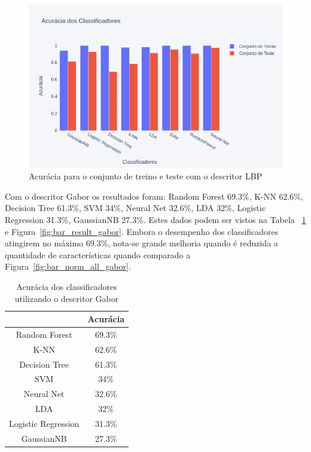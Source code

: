 \documentclass[a4paper, 12 pt, conference]{ieeeconf}  %
\begin{document}
\begin{figure}[!htbp]
	\centering
	\includegraphics[width=1.0\linewidth,clip=true,trim=0cm 0cm 0cm 0cm, keepaspectratio=true]{bar_result_lbp.png}
	\caption{Acurácia para o conjunto de treino e teste com o descritor LBP}
	\label{fig:bar_result_lbp}
\end{figure}

Com o descritor Gabor os resultados foram: Random Forest 69.3\%, K-NN 62.6\%, Decision Tree 61.3\%, SVM 34\%, Neural Net 32.6\%, LDA 32\%, Logistic Regression 31.3\%, GaussianNB 27.3\%. Estes dados podem ser vistos na Tabela ~\ref{tab:result_gabor} e Figura~\ref{fig:bar_result_gabor}. Embora o desempenho dos classificadores atingirem no máximo 69.3\%, nota-se grande melhoria quando é reduzida a quantidade de características quando comparado a Figura~\ref{fig:bar_norm_all_gabor}.

\begin{table}[!htbp]
	\caption{Acurácia dos classificadores utilizando o descritor Gabor}
	\begin{center}
		\begin{tabular}{|c|c|}
			\hline
			& Acurácia \\
			\hline
			Random Forest       & 69.3\%   \\
			K-NN                & 62.6\%   \\
			Decision Tree       & 61.3\%   \\
			SVM                 & 34\%     \\
			Neural Net          & 32.6\%   \\
			LDA                 & 32\%     \\
			Logistic Regression & 31.3\%   \\
			GaussianNB          & 27.3\%   \\
			\hline
		\end{tabular}
		\label{tab:result_gabor}
	\end{center}
\end{table}
\end{document}
